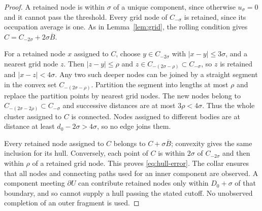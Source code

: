 \begin{proof}
A retained node is within $\sigma$ of a unique component, since otherwise
$u_\sigma=0$ and it cannot pass the threshold. Every grid node of
$C_{-\sigma}$ is retained, since its occupation average is one.
As in Lemma~\ref{lem:grid}, the rolling condition gives
$C=C_{-2\sigma}+2\sigma\overline B$.

For a retained node $x$ assigned to $C$, choose $y\in C_{-2\sigma}$
with $|x-y|\le3\sigma$, and a nearest grid node $z$. Then
$|z-y|\le\rho$ and $z\in C_{-(2\sigma-\rho)}\subset C_{-\sigma}$,
so $z$ is retained and $|x-z|<4\sigma$. Any two such deeper nodes can
be joined by a straight segment in the convex set
$C_{-(2\sigma-\rho)}$. Partition the segment into lengths at most
$\rho$ and replace the partition points by nearest grid nodes. The
new nodes belong to $C_{-(2\sigma-2\rho)}\subset C_{-\sigma}$ and
successive distances are at most $3\rho<4\sigma$. Thus the whole
cluster assigned to $C$ is connected. Nodes assigned to different
bodies are at distance at least $d_0-2\sigma>4\sigma$, so no edge
joins them.

Every retained node assigned to $C$ belongs to $C+\sigma\overline B$;
convexity gives the same inclusion for its hull. Conversely, each point
of $C$ is within $2\sigma$ of $C_{-2\sigma}$ and then within $\rho$
of a retained grid node. This proves \eqref{eq:hull-error}. The collar
ensures that all nodes and connecting paths used for an inner component
are observed. A component meeting $\partial U$ can contribute retained
nodes only within $D_0+\sigma$ of that boundary, and so cannot supply a
hull passing the stated cutoff. No unobserved completion of an outer
fragment is used.
\end{proof}

